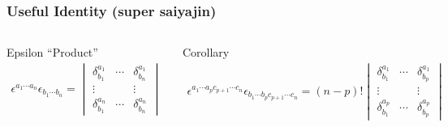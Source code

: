\begin{frame}
  \frametitle{Useful Identity (super saiyajin)}
  \begin{columns}
    \begin{alertblock}{Epsilon ``Product''}
      \begin{align*}
        \epsilon^{a_1 \cdots a_n}\epsilon_{b_1 \cdots b_n}=
        \begin{vmatrix}
          \delta^{a_1}_{b_1} &\cdots&\delta^{a_1}_{b_n}\\
          \vdots & & \vdots \\
          \delta^{a_n}_{b_1}& \cdots & \delta^{a_n}_{b_n}
        \end{vmatrix}
      \end{align*}
    \end{alertblock}

    \begin{block}{Corollary}
      \begin{align*}
        \epsilon^{a_1 \cdots a_p c_{p+1}\cdots c_n}\epsilon_{b_1 \cdots b_p c_{p+1}\cdots c_n}= (n-p)!
        \begin{vmatrix}
          \delta^{a_1}_{b_1} &\cdots&\delta^{a_1}_{b_p}\\
          \vdots & & \vdots \\
          \delta^{a_p}_{b_1}& \cdots & \delta^{a_p}_{b_p}
        \end{vmatrix}
      \end{align*}
    \end{block}


\end{columns}
\end{frame}
